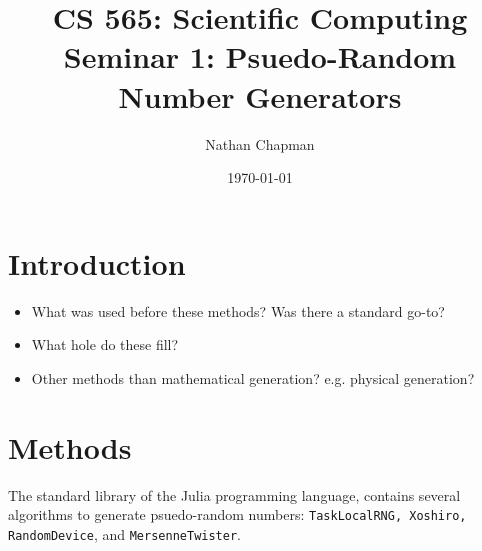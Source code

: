 \documentclass{article}
\title{\vspace*{-0.625in}CS 565: Scientific Computing \\ Seminar 1: Psuedo-Random Number Generators}
\author{Nathan Chapman}
\date{\today}
\begin{document}
    \maketitle

    \section*{Introduction}

        \begin{itemize}
            \item What was used before these methods?  Was there a standard go-to?
            \item What hole do these fill?
            \item Other methods than mathematical generation?  e.g. physical generation?
        \end{itemize}
    
    \section*{Methods}

        The standard library of the Julia programming language, contains several algorithms to generate psuedo-random numbers\cite{Julia-2017}: \texttt{TaskLocalRNG, Xoshiro, RandomDevice}, and \texttt{MersenneTwister}.

\end{document}
